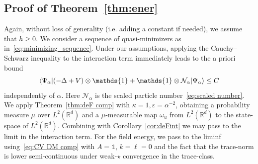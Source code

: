 \documentclass[10pt]{amsart}
\theoremstyle{definition}\newtheorem{defi}[theo]{Definition}\newtheorem{rema}[theo]{Remark}\newtheorem{exam}[theo]{Example}\newtheorem{exem}[theo]{Example}\newtheorem{nota}[theo]{Notation}
\newcommand{\R}{\mathbb{R}}
\newcommand{\cN}{\mathcal{N}}
\newcommand{\1}{\mathds{1}}
\newcommand{\eps}{\varepsilon}
\let\originalleft\left
\let\originalright\right
\renewcommand{\left}{\mathopen{}\mathclose\bgroup\originalleft}
\renewcommand{\right}{\aftergroup\egroup\originalright}
\begin{document}
\subsection{Proof of Theorem~\ref{thm:ener}}

Again, without loss of generality (i.e. adding a constant if needed), we assume that $h\geq 0$. We consider a sequence of quasi-minimizers as in~\eqref{eq:minimizing_sequence}. Under our assumptions, applying the Cauchy--Schwarz inequality to the interaction term immediately leads to the a priori bound
\begin{equation}\label{eq:apriori}
\left\langle\Psi_\alpha\left| \left(- \Delta + V \right) \otimes \1 + \1 \otimes \cN_\alpha \right| \Psi_\alpha \right\rangle \leq C
\end{equation}
independently of $\alpha$. Here $\cN_\alpha$ is the scaled particle number~\eqref{eq:scaled number}. We apply Theorem~\ref{thm:deF comp} with $\kappa = 1, \eps = \alpha^{-2}$, obtaining a probability measure $\mu$ over $L^2 (\R^d)$ and a $\mu$-measurable map $\omega_u$ from $L^2 (\R^d)$ to the state-space of $L^2 (\R^d)$. Combining with Corollary~\ref{cor:deFint} we may pass to the limit in the interaction term. For the field energy, we pass to the liminf using~\eqref{eq:CV DM comp} with $A=\1$, $k=\ell = 0$ and the fact that the trace-norm is lower semi-continuous under weak-$\star$ convergence in the trace-class.
\end{document}
